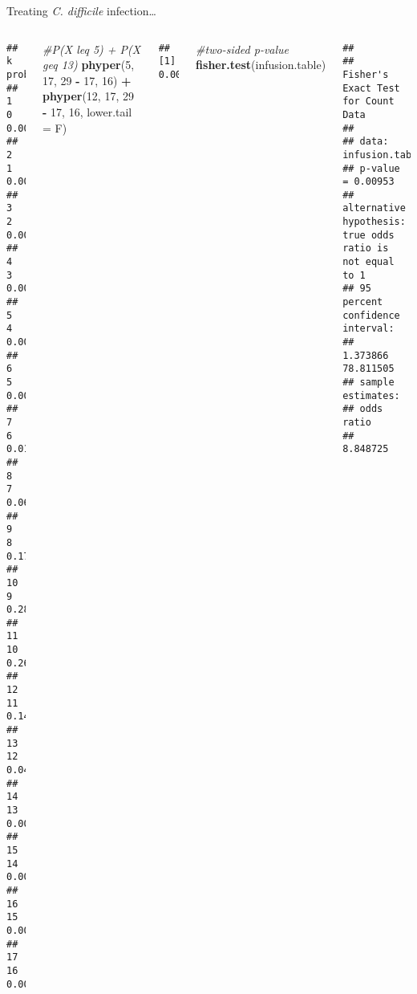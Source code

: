 \documentclass[
  ignorenonframetext,
  aspectratio=169]{beamer}
\newenvironment{Shaded}{\begin{snugshade}}{\end{snugshade}}
\newcommand{\AttributeTok}[1]{\textcolor[rgb]{0.13,0.29,0.53}{#1}}
\newcommand{\CommentTok}[1]{\textcolor[rgb]{0.56,0.35,0.01}{\textit{#1}}}
\newcommand{\DecValTok}[1]{\textcolor[rgb]{0.00,0.00,0.81}{#1}}
\newcommand{\FunctionTok}[1]{\textcolor[rgb]{0.13,0.29,0.53}{\textbf{#1}}}
\newcommand{\NormalTok}[1]{#1}
\newcommand{\SpecialCharTok}[1]{\textcolor[rgb]{0.81,0.36,0.00}{\textbf{#1}}}
\newcommand{\columnsbegin}{\begin{columns}}
\newcommand{\columnsend}{\end{columns}}
\begin{document}
\begin{frame}[fragile]{Treating \emph{C. difficile} infection\ldots{}}
\protect\hypertarget{treating-c.-difficile-infection-3}{}
\columnsbegin


\scriptsize

\begin{verbatim}
##     k     prob
## 1   0 0.000000
## 2   1 0.000000
## 3   2 0.000000
## 4   3 0.000000
## 5   4 0.000035
## 6   5 0.001094
## 7   6 0.012036
## 8   7 0.063046
## 9   8 0.177317
## 10  9 0.283708
## 11 10 0.264794
## 12 11 0.144433
## 13 12 0.045135
## 14 13 0.007715
## 15 14 0.000661
## 16 15 0.000024
## 17 16 0.000000
\end{verbatim}


\scriptsize

\begin{Shaded}
\begin{Highlighting}[]
\CommentTok{\#P(X leq 5) + P(X geq 13)}
\FunctionTok{phyper}\NormalTok{(}\DecValTok{5}\NormalTok{, }\DecValTok{17}\NormalTok{, }\DecValTok{29} \SpecialCharTok{{-}} \DecValTok{17}\NormalTok{, }\DecValTok{16}\NormalTok{) }\SpecialCharTok{+} 
  \FunctionTok{phyper}\NormalTok{(}\DecValTok{12}\NormalTok{, }\DecValTok{17}\NormalTok{, }\DecValTok{29} \SpecialCharTok{{-}} \DecValTok{17}\NormalTok{, }\DecValTok{16}\NormalTok{, }\AttributeTok{lower.tail =}\NormalTok{ F)}
\end{Highlighting}
\end{Shaded}

\begin{verbatim}
## [1] 0.009530323
\end{verbatim}

\begin{Shaded}
\begin{Highlighting}[]
\CommentTok{\#two{-}sided p{-}value}
\FunctionTok{fisher.test}\NormalTok{(infusion.table)}
\end{Highlighting}
\end{Shaded}

\begin{verbatim}
## 
##  Fisher's Exact Test for Count Data
## 
## data:  infusion.table
## p-value = 0.00953
## alternative hypothesis: true odds ratio is not equal to 1
## 95 percent confidence interval:
##   1.373866 78.811505
## sample estimates:
## odds ratio 
##   8.848725
\end{verbatim}

\columnsend
\end{frame}
\end{document}
